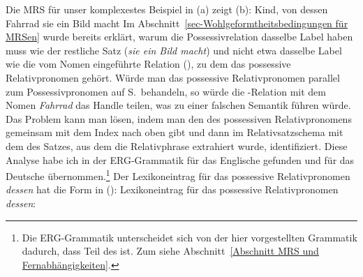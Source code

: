 Die MRS für unser komplexestes Beispiel in (a) zeigt (b):
\eal
\ex\label{ex Kind, von dessen Fahrrad sie ein Bild macht}
Kind, von dessen Fahrrad sie ein Bild macht
\ex {}
\zl
Im Abschnitt~\ref{sec-Wohlgeformtheitsbedingungen für MRSen} wurde bereits erklärt, warum die
Possessivrelation  dasselbe Label haben muss wie der restliche Satz (\emph{sie
  ein Bild macht}) und nicht etwa dasselbe Label wie die vom Nomen eingeführte Relation
(), zu dem das possessive Relativpronomen gehört. Würde man das possessive
Relativpronomen parallel zum Possessivpronomen auf S.\,\pageref{le-Possessivpronomen} behandeln, so
würde die -Relation mit dem Nomen \emph{Fahrrad} das 
Handle teilen, was zu einer falschen Semantik führen würde. Das Problem kann man lösen, indem man
den \ltopw des possessiven Relativpronomens gemeinsam mit dem Index nach oben gibt und dann im
Relativsatzschema mit dem \ltopw des Satzes, aus dem die Relativphrase extrahiert wurde,
identifiziert. Diese Analyse habe ich in der ERG-Grammatik für das Englische \citep{CF2000a-u,FCS2000a} gefunden und für das
Deutsche übernommen.\footnote{%
Die ERG-Grammatik unterscheidet sich von der hier vorgestellten Grammatik dadurch, dass \rels Teil
des \contwes ist. Zum \contw siehe Abschnitt~\ref{Abschnitt MRS und Fernabhängigkeiten}.
}
Der Lexikoneintrag für das possessive Relativpronomen \emph{dessen} hat die Form in ():
\eas
\label{le-dessen}%
Lexikoneintrag für das possessive Relativpronomen \emph{dessen}:\\
